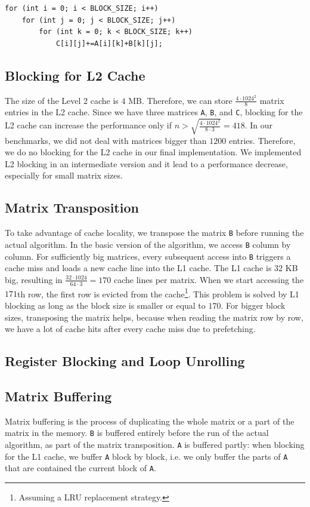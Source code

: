 \documentclass[12pt]{article}
\begin{document}
\begin{lstlisting}
for (int i = 0; i < BLOCK_SIZE; i++)
	for (int j = 0; j < BLOCK_SIZE; j++)
		for (int k = 0; k < BLOCK_SIZE; k++)
			C[i][j]+=A[i][k]+B[k][j];
\end{lstlisting}

\subsection{Blocking for L2 Cache}
The size of the Level 2 cache is $4$ MB. Therefore, we can store $\frac{4 \cdot 1024^2}{8}$ matrix entries in the L2 cache. Since we have three matrices \lstinline{A}, \lstinline{B}, and \lstinline{C}, blocking for the L2 cache can increase the performance only if $n > \sqrt{\frac{4 \cdot 1024^2}{8 \cdot 3}} = 418$. In our benchmarks, we did not deal with matrices bigger than $1200$ entries. Therefore, we do no blocking for the L2 cache in our final implementation. We implemented L2 blocking in an intermediate version and it lead to a performance decrease, especially for small matrix sizes.

\subsection{Matrix Transposition}
To take advantage of cache locality, we transpose the matrix \lstinline{B} before running the actual algorithm. In the basic version of the algorithm, we access \lstinline{B} column by column. For sufficiently big matrices, every subsequent access into \lstinline{B} triggers a cache miss and loads a new cache line into the L1 cache. The L1 cache is $32$ KB big, resulting in $\frac{32 \cdot 1024}{64 \cdot 3} = 170$ cache lines per matrix. When we start accessing the $171$th row, the first row is evicted from the cache\footnote{Assuming a LRU replacement strategy.}. This problem is solved by L1 blocking as long as the block size is smaller or equal to $170$. For bigger block sizes, transposing the matrix helps, because when reading the matrix row by row, we have a lot of cache hits after every cache miss due to prefetching. 

\subsection{Register Blocking and Loop Unrolling}

\subsection{Matrix Buffering}
Matrix buffering is the process of duplicating the whole matrix or a part of the matrix in the memory. \lstinline{B} is buffered entirely before the run of the actual algorithm, as part of the matrix transposition. \lstinline{A} is buffered partly: when blocking for the L1 cache, we buffer \lstinline{A} block by block, i.e. we only buffer the parts of \lstinline{A} that are contained the current block of \lstinline{A}.
\end{document}
